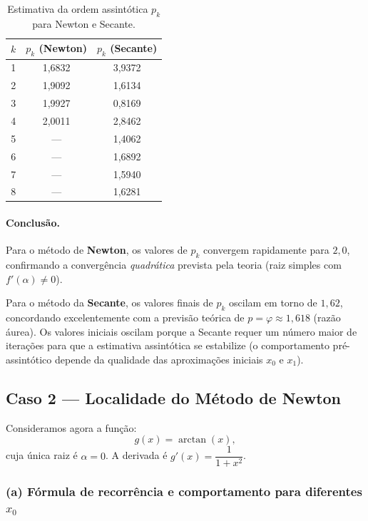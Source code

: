 \documentclass[12pt, a4paper]{article}
\begin{document}
\begin{table}[H]
    \centering
    \caption{Estimativa da ordem assintótica $p_k$ para Newton e Secante.}
    \label{tab:pk}
    \begin{tabular}{c c c}
        \toprule
        $k$ & $p_k$ (Newton) & $p_k$ (Secante) \\
        \midrule
        1 & 1,6832 & 3,9372 \\
        2 & 1,9092 & 1,6134 \\
        3 & 1,9927 & 0,8169 \\
        4 & 2,0011 & 2,8462 \\
        5 & ---    & 1,4062 \\
        6 & ---    & 1,6892 \\
        7 & ---    & 1,5940 \\
        8 & ---    & 1,6281 \\
        \bottomrule
    \end{tabular}
\end{table}

\paragraph{Conclusão.}
Para o método de \textbf{Newton}, os valores de $p_k$ convergem rapidamente para $2{,}0$, confirmando a convergência \emph{quadrática} prevista pela teoria (raiz simples com $f'(\alpha) \neq 0$).

Para o método da \textbf{Secante}, os valores finais de $p_k$ oscilam em torno de $1{,}62$, concordando excelentemente com a previsão teórica de $p = \varphi \approx 1{,}618$ (razão áurea). Os valores iniciais oscilam porque a Secante requer um número maior de iterações para que a estimativa assintótica se estabilize (o comportamento pré-assintótico depende da qualidade das aproximações iniciais $x_0$ e $x_1$).


\subsection{Caso 2 --- Localidade do Método de Newton}

Consideramos agora a função:
\begin{equation}
    g(x) = \arctan(x),
\end{equation}
cuja única raiz é $\alpha = 0$. A derivada é $g'(x) = \dfrac{1}{1 + x^2}$.


\subsubsection*{(a) Fórmula de recorrência e comportamento para diferentes $x_0$}
\end{document}
